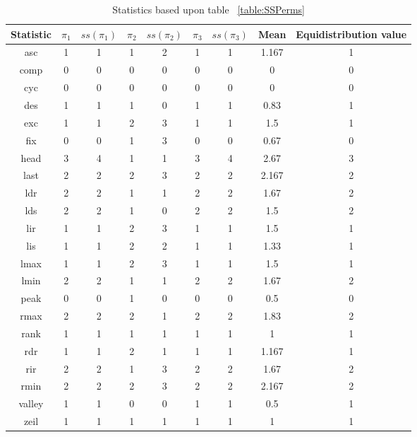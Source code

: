 \documentclass[12pt]{article}
\begin{document}
\begin{table}[H]
\caption{Statistics based upon table ~\ref{table:SSPerms}}
\centering
\begin{tabular}{c | c c c c c c c | c}
\hline\hline
Statistic & $\pi_1$ & $ss(\pi_1)$ & $\pi_2$ & $ss(\pi_2)$ & $\pi_3$ & $ss(\pi_3)$ & Mean & Equidistribution value\\ [0.5ex]
\hline
asc & 1 & 1 & 1 & 2 & 1 & 1 & 1.167 & 1\\ 
comp & 0 & 0 & 0 & 0 & 0 & 0 & 0 & 0\\
cyc & 0 & 0 & 0 & 0 & 0 & 0 & 0 & 0\\
des & 1 & 1 & 1 & 0 & 1 & 1 & 0.83 & 1\\
exc & 1 & 1 & 2 & 3 & 1 & 1 & 1.5 & 1\\
fix & 0 & 0 & 1 & 3 & 0 & 0 & 0.67 & 0\\
head & 3 & 4 & 1 & 1 & 3 & 4 & 2.67 & 3\\
last & 2 & 2 & 2 & 3 & 2 & 2 & 2.167 & 2\\
ldr & 2 & 2 & 1 & 1 & 2 & 2 & 1.67 & 2\\
lds & 2 & 2 & 1 & 0 & 2 & 2 & 1.5 & 2\\
lir & 1 & 1 & 2 & 3 & 1 & 1 & 1.5 & 1\\
lis & 1 & 1 & 2 & 2 & 1 & 1 & 1.33 & 1\\
lmax & 1 & 1 & 2 & 3 & 1 & 1 & 1.5 & 1\\
lmin & 2 & 2 & 1 & 1 & 2 & 2 & 1.67 & 2\\
peak & 0 & 0 & 1 & 0 & 0 & 0 & 0.5 & 0\\
rmax & 2 & 2 & 2 & 1 & 2 & 2 & 1.83 & 2\\
rank & 1 & 1 & 1 & 1 & 1 & 1 & 1 & 1\\
rdr & 1 & 1 & 2 & 1 & 1 & 1 & 1.167 & 1\\
rir & 2 & 2 & 1 & 3 & 2 & 2 & 1.67 & 2\\
rmin & 2 & 2 & 2 & 3 & 2 & 2 & 2.167 & 2\\
valley & 1 & 1 & 0 & 0 & 1 & 1 & 0.5 & 1\\
zeil & 1 & 1 & 1 & 1 & 1 & 1 & 1 & 1\\
\hline
\end{tabular}
\label{table:SSPerms1}
\end{table}
\end{document}
